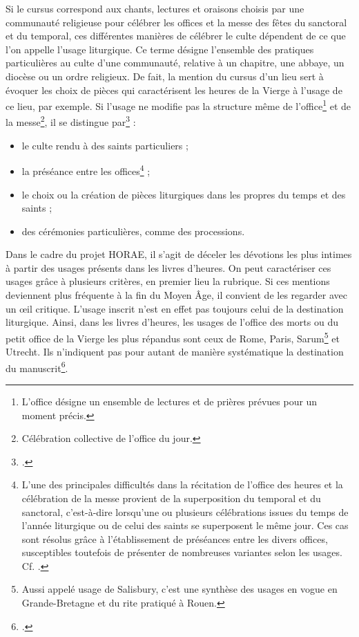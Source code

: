 \documentclass[a4paper,12pt,twoside]{book}
\begin{document}
	Si le cursus correspond aux chants, lectures et oraisons choisis par une communauté religieuse pour célébrer les offices et la messe des fêtes du sanctoral et du temporal, ces différentes manières de célébrer le culte dépendent de ce que l'on appelle l'usage liturgique. Ce terme désigne l’ensemble des pratiques particulières au culte d’une communauté, relative à un chapitre, une abbaye, un diocèse ou un ordre religieux. De fait, la mention du cursus d'un lieu sert à évoquer les choix de pièces qui caractérisent les heures de la Vierge à l'usage de ce lieu, par exemple. Si l'usage ne modifie pas la structure même de l'office\footnote{L'office désigne un ensemble de lectures et de prières prévues pour un moment précis.} et de la messe\footnote{Célébration collective de l'office du jour.}, il se distingue par\footcite{usages_lit} : 
	\begin{itemize}
	    \item le culte rendu à des saints particuliers ;
	    \item la préséance entre les offices\footnote{L'une des principales difficultés dans la récitation de l’office des heures et la célébration de la messe provient de la superposition du temporal et du sanctoral, c’est-à-dire lorsqu’une ou plusieurs célébrations issues du temps de l'année liturgique ou de celui des saints se superposent le même jour. Ces cas sont résolus grâce à l’établissement de préséances entre les divers offices, susceptibles toutefois de présenter de nombreuses variantes selon les usages. Cf. \cite{preseance_offices}.} ;
	    \item le choix ou la création de pièces liturgiques dans les propres du temps et des saints ;
	    \item des cérémonies particulières, comme des processions.
	\end{itemize}
	
	Dans le cadre du projet HORAE, il s'agit de déceler les dévotions les plus intimes à partir des usages présents dans les livres d'heures. On peut caractériser ces usages grâce à plusieurs critères, en premier lieu la rubrique. Si ces mentions deviennent plus fréquente à la fin du Moyen Âge, il convient de les regarder avec un œil critique. L'usage inscrit n'est en effet pas toujours celui de la destination liturgique. Ainsi, dans les livres d’heures, les usages de l’office des morts ou du petit office de la Vierge les plus répandus sont ceux de Rome, Paris, Sarum\footnote{Aussi appelé usage de Salisbury, c'est une synthèse des usages en vogue en Grande-Bretagne et du rite pratiqué à Rouen.} et Utrecht. Ils n'indiquent pas pour autant de manière systématique la destination du manuscrit\footcite{usages_lit}. 
	
\end{document}
